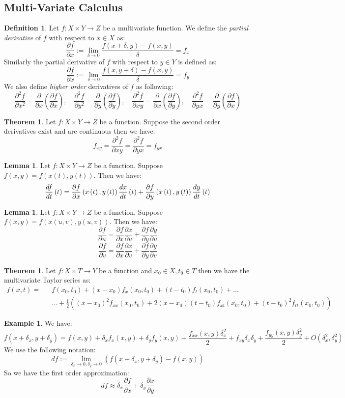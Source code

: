 \documentclass[11pt]{article}
\theoremstyle{definition}
\newtheorem{lemma}[prop]{Lemma}
\newtheorem{thm}[prop]{Theorem}
\newtheorem{defn}[prop]{Definition}
\newtheorem{eg}[prop]{Example}
\newcommand{\brac}[1]{\left(#1\right)}
\newcommand{\diff}[2]{\frac{d\ifthenelse{\equal{#1}{}}{}{#1}}{d#2}}
\newcommand{\pardiff}[2]{\frac{\partial #1}{\partial #2}}
\begin{document}
\subsection{Multi-Variate Calculus}
	\begin{defn}
		Let $f:X\times Y\rightarrow Z$ be a multivariate function. We define the \emph{partial derivative} of $f$ with respect to $x\in X$ as:
		$$\pardiff{f}{x} := \lim_{\delta\rightarrow 0}\frac{f\brac{x+\delta,y}-f\brac{x,y}}{\delta} = f_x$$
		Similarly the partial derivative of $f$ with respect to $y\in Y$ is defined as:
		$$\pardiff{f}{x} := \lim_{\delta\rightarrow 0}\frac{f\brac{x,y+\delta}-f\brac{x,y}}{\delta} = f_y$$
		We also define \emph{higher order} derivatives of $f$ as following:
		$$\pardiff{^2 f}{x^2} = \pardiff{}{x}\brac{\pardiff{f}{x}},\quad  \pardiff{^2 f}{y^2} = \pardiff{}{y}\brac{\pardiff{f}{y}},\quad \pardiff{^2 f}{xy} = \pardiff{}{x}\brac{\pardiff{f}{y}},\quad \pardiff{^2 f}{yx} = \pardiff{}{y}\brac{\pardiff{f}{x}}$$
	\end{defn}
	\begin{thm}
		Let $f:X\times Y\rightarrow Z$ be a function. Suppose the second order derivatives exist and are continuous then we have:
		$$ f_{xy} = \pardiff{^2f}{xy} =\pardiff{^2 f}{yx} = f_{yx}$$
	\end{thm}
	\begin{lemma}
		Let $f:X\times Y \rightarrow Z$ be a function. Suppose $f\brac{x,y} = f\brac{x\brac{t},y\brac{t}}$. Then we have:
		$$\diff{f}{t}\brac{t} = \pardiff{f}{x}\brac{x\brac{t},y\brac{t}}\diff{x}{t}\brac{t} + \pardiff{f}{y}\brac{x\brac{t},y\brac{t}}\diff{y}{t}\brac{t}$$
	\end{lemma}
	\begin{lemma}
		Let $f:X\times Y \rightarrow Z$ be a function. Suppose $f\brac{x,y} = f\brac{x\brac{u,v},y\brac{u,v}}$. Then we have:
		$$\pardiff{f}{u} = \pardiff{f}{x}\pardiff{x}{u} + \pardiff{f}{y}\pardiff{y}{u}$$
		$$\pardiff{f}{v} = \pardiff{f}{x}\pardiff{x}{v} + \pardiff{f}{y}\pardiff{y}{v}$$
	\end{lemma}
	\begin{thm}
		Let $f:X\times T\rightarrow Y$ be a function and $x_0\in X, t_0\in T$ then we have the multivariate Taylor series as:
		\begin{eqnarray*}
		f\brac{x,t} =&& f\brac{x_0,t_0} + \brac{x-x_0}f_x\brac{x_0,t_0}+ \brac{t-t_0}f_t\brac{x_0,t_0} + \dots\\ &&\dots+\frac{1}{2}\brac{ \brac{x-x_0}^2f_{xx}\brac{x_0,t_0}+2\brac{x-x_0}\brac{t-t_0}f_{xt}\brac{x_0,t_0}+\brac{t-t_0}^2f_{tt}\brac{x_0,t_0}}
		\end{eqnarray*}
	\end{thm}
	\begin{eg}
		We have:
		$$f\brac{x+\delta_x,y+\delta_y} = f\brac{x,y} + \delta_x f_x\brac{x,y} + \delta_yf_y\brac{x,y} +\frac{f_{xx}\brac{x,y}\delta_x^2}{2} + f_{xy}\delta_x\delta_y +\frac{f_{yy}\brac{x,y}\delta_y^2}{2} + O\brac{\delta_x^2,\delta_y^2}$$
		We use the following notation:
		$$df:=\lim_{\delta_x\rightarrow 0,\delta_y\rightarrow 0}\brac{f\brac{x+\delta_x,y+\delta_y} -f\brac{x,y}}$$
		So we have the first order approximation:
		$$df \approx \delta_x\pardiff{f}{x}+\delta_y\pardiff{x}{y}$$
	\end{eg}
\end{document}
